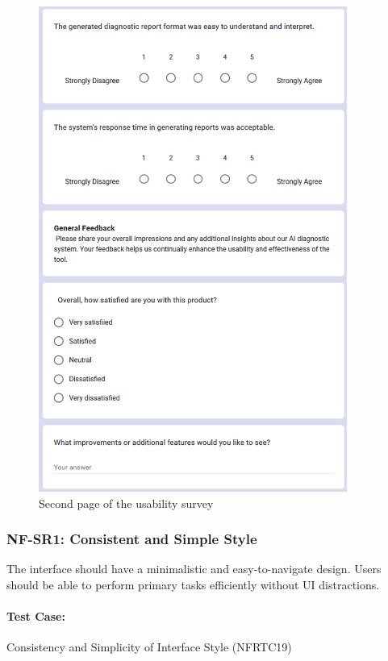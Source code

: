 \documentclass[12pt, titlepage]{article}
\begin{document}
\begin{figure}
\begin{minipage}{0.45\textwidth}
        \includegraphics[width=0.9\textwidth]{usersurvey2.png}
        \caption{Second page of the usability survey}
    \end{minipage}
\end{figure}

\subsubsection{NF-SR1: Consistent and Simple Style}
The interface should have a minimalistic and easy-to-navigate design.  
Users should be able to perform primary tasks efficiently without UI distractions.

\paragraph{Test Case:} Consistency and Simplicity of Interface Style (NFRTC19)
\end{document}
